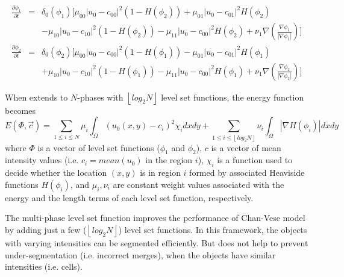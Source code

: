 \begin{eqnarray}
\frac{\partial \phi_1}{\partial t}  & = &  \delta_0(\phi_1) [\mu_{00}|u_0 - c_{00}|^2(1-H(\phi_2)) + \mu_{01}|u_0 - c_{01}|^2H(\phi_2) \\
\nonumber
 & & - \mu_{10}|u_0 - c_{10}|^2(1-H(\phi_2)) - \mu_{11}|u_0 - c_{00}|^2H(\phi_2) +\nu_1\nabla(\frac{\nabla\phi_1}{|\nabla\phi_1|})]
\end{eqnarray}
\begin{eqnarray}
\frac{\partial \phi_2}{\partial t}  & = &  \delta_0(\phi_2) [\mu_{00}|u_0 - c_{00}|^2(1-H(\phi_1)) - \mu_{01}|u_0 - c_{01}|^2H(\phi_1) \\
\nonumber
 & & + \mu_{10}|u_0 - c_{10}|^2(1-H(\phi_1)) - \mu_{11}|u_0 - c_{00}|^2H(\phi_1) +\nu_1\nabla(\frac{\nabla\phi_2}{|\nabla\phi_2|})]
\end{eqnarray}

When extends to $N$-phases with $\left \lfloor log_2N \right \rfloor$ level set functions, the energy function becomes
\begin{equation}
E(\Phi, \vec{c}) = \sum_{1\le i \le N} \mu_i\int_{\Omega}(u_0(x,y) - c_i)^2\chi_idxdy + \sum_{1 \le i \le \left \lfloor log_2N \right \rfloor}\nu_i\int_{\Omega}|\nabla H(\phi_i)|dxdy
\end{equation}
where $\Phi$ is a vector of level set functions ($\phi_1$ and $\phi_2$), $c$ is a vector of mean intensity values (i.e. $c_i = mean(u_0)$ in the region $i$), $\chi_i$ is a function used to decide whether the location $(x,y)$ is in region $i$ formed by associated Heaviside functions $H(\phi_i)$, and $\mu_i, \nu_i$ are constant weight values associated with the energy and the length terms of each level set function, respectively. 

The multi-phase level set function improves the performance of Chan-Vese model by adding just a few ($\left \lfloor log_2N \right \rfloor$) level set functions. In this framework, the objects with varying intensities can be segmented efficiently. But does not help to prevent under-segmentation (i.e. incorrect merges), when the objects have similar intensities (i.e. cells).

